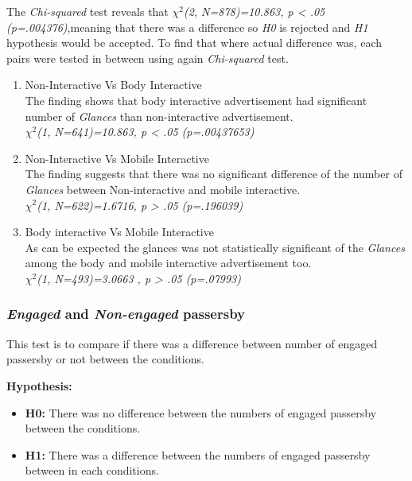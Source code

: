 The \emph{Chi-squared} test reveals that ${\chi}^2$\emph{(2, N=878)=10.863, p < .05 (p=.004376)},meaning that there was a difference so \emph{H0} is rejected and \emph{H1} hypothesis would be accepted.
To find that where actual difference was, each pairs were tested in between using again \emph{Chi-squared} test.

\begin{enumerate}
\item Non-Interactive Vs Body Interactive \\
The finding shows that body interactive advertisement had significant number of \emph{Glances} than non-interactive advertisement. \\
${\chi}^2$\emph{(1, N=641)=10.863, p < .05 (p=.00437653)}



\item Non-Interactive Vs Mobile Interactive  \\
The finding suggests that there was no significant difference of the number of \emph{Glances} between Non-interactive and mobile interactive.\\
${\chi}^2$\emph{(1, N=622)=1.6716, p > .05 (p=.196039)}

\item Body interactive Vs Mobile Interactive \\
As can be expected the glances was not statistically significant of the \emph{Glances} among the body and mobile interactive advertisement too.\\
${\chi}^2$\emph{(1, N=493)=3.0663 , p > .05 (p=.07993)}

\end{enumerate}


\subsubsection {\emph{Engaged} and \emph{Non-engaged} passersby}
This test is to compare if there was a difference between number of engaged passersby or not between the conditions.

\textbf{Hypothesis: }
\begin{itemize}
\item \textbf{H0:} There was no difference between the numbers of engaged passersby between the conditions.
\item \textbf{H1:} There was a difference between the numbers of engaged passersby between in each conditions.
\end{itemize}


